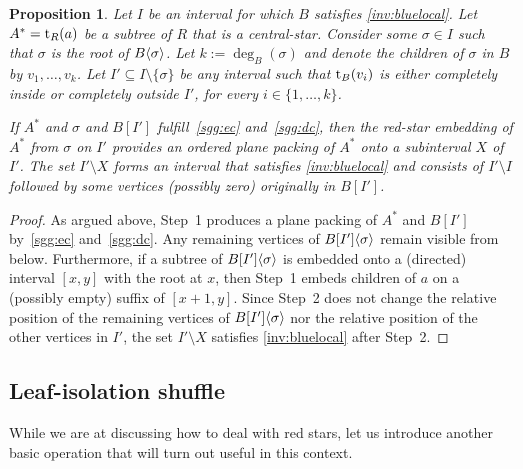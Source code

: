 \documentclass[11pt,a4paper,colorlinks=true,urlcolor=blue,citecolor=red]{article}
\theoremstyle{plain}
\newtheorem{proposition}[theorem]{Proposition}
\begin{document}
\begin{proposition}\label{prop:stargreedygrab}
  Let $I$ be an interval for which $B$ satisfies
  \ref{inv:bluelocal}. Let $A^*=\mathrm t_R(a)$ be a subtree of $R$ that is a
  central-star. Consider some $\sigma\in I$ such that $\sigma$ is the
  root of $B\langle{\sigma}\rangle$. Let $k:=\deg_{B}(\sigma)$ and denote the
  children of $\sigma$ in $B$ by $v_1,\dots,v_k$. Let
  $I'\subseteq I\setminus\{\sigma\}$ be any interval such that
  $\mathrm t_B(v_i)$ is either completely inside or completely outside $I'$,
  for every $i\in\{1,\ldots,k\}$.

  If $A^*$ and $\sigma$ and $B[I']$ fulfill~\ref{sgg:ec}
  and~\ref{sgg:dc}, then the red-star embedding of $A^*$ from $\sigma$
  on $I'$ provides an ordered plane packing of $A^*$ onto a subinterval
  $X$ of $I'$. The set $I'\setminus X$ forms an interval that satisfies
  \ref{inv:bluelocal} and consists of $I'\setminus I$ followed by some
  vertices (possibly zero) originally in $B[I']$.
\end{proposition}
\begin{proof}
  As argued above, Step~1 produces a plane packing of $A^*$ and $B[I']$
  by~\ref{sgg:ec} and~\ref{sgg:dc}. Any remaining vertices of
  $B{[I']}\langle{\sigma}\rangle$ remain visible from below. Furthermore, if a
  subtree of $B{[I']}\langle{\sigma}\rangle$ is embedded onto a (directed)
  interval $[x,y]$ with the root at $x$, then Step~1 embeds children of
  $a$ on a (possibly empty) suffix of $[x+1,y]$. Since Step~2 does not
  change the relative position of the remaining vertices of
  $B{[I']}\langle{\sigma}\rangle$ nor the relative position of the other
  vertices in $I'$, the set $I'\setminus X$ satisfies
  \ref{inv:bluelocal} after Step~2.
\end{proof}

\subsection{Leaf-isolation shuffle}
While we are at discussing how to deal with red stars, let us introduce
another basic operation that will turn out useful in this context.
\end{document}
